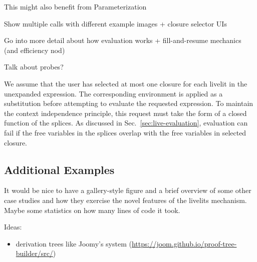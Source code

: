 This might also benefit from Parameterization

Show multiple calls with different example images + closure selector UIs

Go into more detail about how evaluation works + fill-and-resume mechanics (and efficiency nod)

Talk about probes?

We assume that the user has selected at most one closure for each livelit in the unexpanded expression.
The corresponding environment is applied as a substitution before attempting to evaluate the requested expression.
To maintain the context independence principle, this request must take the form of a closed function 
of the splices. 
As discussed in Sec.~\ref{sec:live-evaluation}, evaluation can fail if the free variables in the splices 
overlap with the free variables in selected closure.

\subsection{Additional Examples}\label{sec:additional-examples}
It would be nice to have a gallery-style figure and a brief overview of some other case studies
and how they exercise the novel features of the livelits mechanism. Maybe some statistics on how
many lines of code it took.

Ideas:
\begin{itemize}
  \item derivation trees like Joomy's system (\url{https://joom.github.io/proof-tree-builder/src/})
\end{itemize}